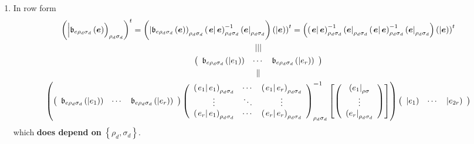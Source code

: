 \documentclass[aps,preprint]{revtex4}
\begin{document}
\begin{enumerate}
\item In row form 
\begin{gather}
\left( \left\vert \overset{}{\mathfrak{b}_{e\rho _{d}\sigma _{d}}\left( 
\boldsymbol{e}\right) }\right) _{\rho _{d}\sigma _{d}}\right) ^{t}=\left( 
\overset{}{\left\vert \mathfrak{b}_{e\rho _{d}\sigma _{d}}\left( \boldsymbol{%
e}\right) \right) _{\rho _{d}\sigma _{d}}\left( \left. \boldsymbol{e}%
\right\vert \boldsymbol{e}\right) _{\rho _{d}\sigma _{d}}^{-1}\left( 
\boldsymbol{e}\right\vert _{\rho _{d}\sigma _{d}}}\right) \left( \left\vert 
\overset{}{\boldsymbol{e}}\right) \right) ^{t}=\left( \left( \left. 
\boldsymbol{e}\right\vert \boldsymbol{e}\right) _{\rho _{d}\sigma
_{d}}^{-1}\left( \boldsymbol{e}\right\vert _{\rho _{d}\sigma _{d}}\left(
\left. \boldsymbol{e}\right\vert \boldsymbol{e}\right) _{\rho _{d}\sigma
_{d}}^{-1}\left( \boldsymbol{e}\right\vert _{\rho _{d}\sigma _{d}}\right)
\left( \left\vert \overset{}{\boldsymbol{e}}\right) \right) ^{t} \\
\mid \mid \mid \\
\left( 
\begin{array}{ccc}
\mathfrak{b}_{e\rho _{d}\sigma _{d}}\left( \left\vert e_{1}\right) \right) & 
\cdots & \mathfrak{b}_{e\rho _{d}\sigma _{d}}\left( \left\vert e_{r}\right)
\right)%
\end{array}%
\right) \\
\parallel \\
\left( \left( 
\begin{array}{ccc}
\mathfrak{b}_{e\rho _{d}\sigma _{d}}\left( \left\vert e_{1}\right) \right) & 
\cdots & \mathfrak{b}_{e\rho _{d}\sigma _{d}}\left( \left\vert e_{r}\right)
\right)%
\end{array}%
\right) \left( 
\begin{array}{ccc}
\left( \left. e_{1}\right\vert e_{1}\right) _{\rho _{d}\sigma _{d}} & \cdots
& \left( \left. e_{1}\right\vert e_{r}\right) _{\rho _{d}\sigma _{d}} \\ 
\vdots & \ddots & \vdots \\ 
\left( \left. e_{r}\right\vert e_{1}\right) _{\rho _{d}\sigma _{d}} & \cdots
& \left( \left. e_{r}\right\vert e_{r}\right) _{\rho _{d}\sigma _{d}}%
\end{array}%
\right) _{\rho _{d}\sigma _{d}}^{\boldsymbol{-}1}\left[ \left( 
\begin{array}{c}
\left( e_{1}\right\vert _{\rho \sigma } \\ 
\vdots \\ 
\left( e_{r}\right\vert _{\rho _{d}\sigma _{d}}%
\end{array}%
\right) \right] \right) \left( 
\begin{array}{ccc}
\left\vert e_{1}\right) & \cdots & \left\vert e_{2r}\right)%
\end{array}%
\right)
\end{gather}%
which \textbf{does depend on} $\left\{ \rho _{d},\sigma _{d}\right\} $.


\end{enumerate}
\end{document}
